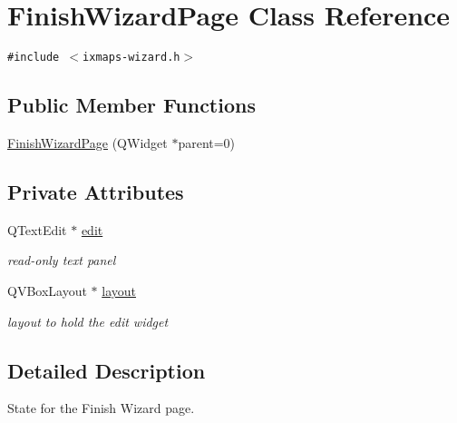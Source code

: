 \hypertarget{classFinishWizardPage}{
\section{FinishWizardPage Class Reference}
\label{classFinishWizardPage}
}
{\tt \#include $<$ixmaps-wizard.h$>$}

\subsection*{Public Member Functions}
\begin{CompactItemize}
\item 
\hyperlink{classFinishWizardPage_22aafaadb5bb87d86f95d42d69241c0a}{FinishWizardPage} (QWidget $\ast$parent=0)
\end{CompactItemize}
\subsection*{Private Attributes}
\begin{CompactItemize}
\item 
\hypertarget{classFinishWizardPage_4624cc0044aee59b716246722d4e8ca9}{
QTextEdit $\ast$ \hyperlink{classFinishWizardPage_4624cc0044aee59b716246722d4e8ca9}{edit}}
\label{classFinishWizardPage_4624cc0044aee59b716246722d4e8ca9}

\begin{CompactList}\small\item\em read-only text panel \item\end{CompactList}\item 
\hypertarget{classFinishWizardPage_b310e6e66c791a2b3543faf7e928247f}{
QVBoxLayout $\ast$ \hyperlink{classFinishWizardPage_b310e6e66c791a2b3543faf7e928247f}{layout}}
\label{classFinishWizardPage_b310e6e66c791a2b3543faf7e928247f}

\begin{CompactList}\small\item\em layout to hold the edit widget \item\end{CompactList}\end{CompactItemize}


\subsection{Detailed Description}
State for the Finish Wizard page. 

